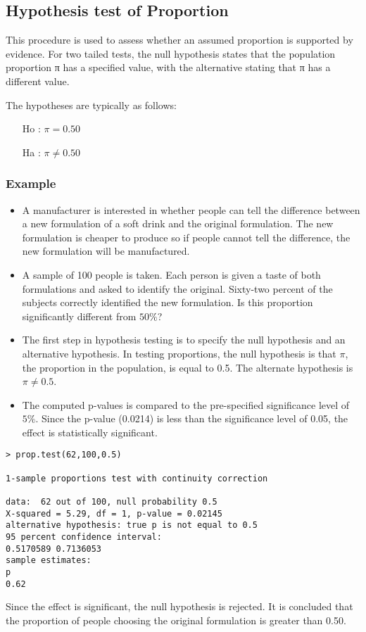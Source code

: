 \documentclass[a4paper,12pt]{article}
\begin{document}
\subsection{Hypothesis test of Proportion}
This procedure is used to assess whether an assumed proportion is supported by evidence. For two tailed tests, the null hypothesis states that the population proportion  π has a specified value, with the alternative stating that π has a different value. 

The hypotheses are typically as follows:   

\begin{itemize}
	\item[Ho] : $\pi = 0.50$
	\item[Ha] : $\pi \neq 0.50$
\end{itemize}

\subsubsection{Example}
\begin{itemize}
    \item A manufacturer is interested in whether people can tell the difference between a new formulation of a soft drink and the original formulation. The new formulation is cheaper to produce so if people cannot tell the difference, the new formulation will be manufactured. 

    \item A sample of 100 people is taken. Each person is given a taste of both formulations and asked to identify the original. Sixty-two percent of the subjects correctly identified the new formulation. Is this proportion significantly different from $50\%$? 

    \item The first step in hypothesis testing is to specify the null hypothesis and an alternative hypothesis. In testing proportions, the null hypothesis is that $\pi$, the proportion in the population, is equal to 0.5. The alternate hypothesis is $\pi \neq 0.5$. 

    \item The computed p-values is compared to the pre-specified significance level of $5\%$. Since the p-value (0.0214) is less than the significance level of 0.05, the effect is statistically significant. 
\end{itemize}

\begin{framed}
\begin{verbatim}
> prop.test(62,100,0.5)

1-sample proportions test with continuity correction

data:  62 out of 100, null probability 0.5 
X-squared = 5.29, df = 1, p-value = 0.02145
alternative hypothesis: true p is not equal to 0.5 
95 percent confidence interval:
0.5170589 0.7136053 
sample estimates:
p 
0.62 
\end{verbatim}
\end{framed}
Since the effect is significant, the null hypothesis is rejected. It is concluded that the proportion of people choosing the original formulation is greater than 0.50. 
\end{document}

